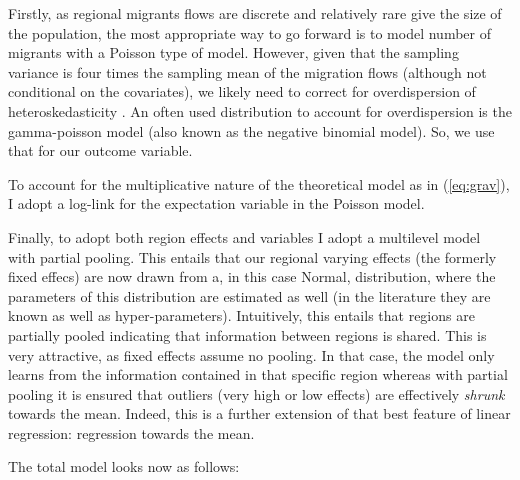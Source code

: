 \documentclass[fleqn,10pt]{SelfArx} %
\begin{document}
        Firstly, as regional migrants flows are discrete and
        relatively rare give the size of the population, the most
        appropriate way to go forward is to model number of migrants
        with a Poisson type of model. However, given that the sampling
        variance is four times the sampling mean of the migration
        flows (although not conditional on the covariates), we likely
        need to correct for overdispersion of heteroskedasticity
        \citep[][states that heteroskedasticity (rather than the
        presence of too many zeros) is responsible for the main
        differences.]{silva2006log}. An often used distribution to
        account for overdispersion is the gamma-poisson model (also
        known as the negative binomial model). So, we use that for our
        outcome variable.

        To account for the multiplicative nature of the theoretical
        model as in (\ref{eq:grav}), I adopt a log-link for the
        expectation variable in the Poisson model.

        Finally, to adopt both region effects and variables I adopt a
        multilevel model with partial pooling. This entails that our
        regional varying effects (the formerly fixed effecs) are now
        drawn from a, in this case Normal, distribution, where the
        parameters of this distribution are estimated as well (in the
        literature they are known as well as
        hyper-parameters). Intuitively, this entails that regions are
        partially pooled indicating that information between regions
        is shared. This is very attractive, as fixed effects assume no
        pooling. In that case, the model only learns from the information contained
        in that specific region whereas with partial pooling it is ensured that
        outliers (very high or low effects) are effectively
        \emph{shrunk} towards the mean. Indeed, this is a further
        extension of that best feature of linear regression:
        regression towards the mean.

        The total model looks now as follows:
        
\end{document}
